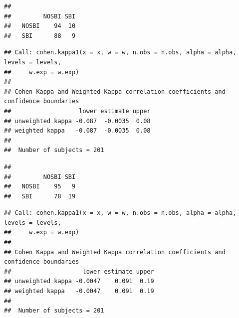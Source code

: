 \documentclass[
]{book}
\newenvironment{Shaded}{\begin{snugshade}}{\end{snugshade}}
\newcommand{\AttributeTok}[1]{\textcolor[rgb]{0.13,0.29,0.53}{#1}}
\newcommand{\CommentTok}[1]{\textcolor[rgb]{0.56,0.35,0.01}{\textit{#1}}}
\newcommand{\FunctionTok}[1]{\textcolor[rgb]{0.13,0.29,0.53}{\textbf{#1}}}
\newcommand{\NormalTok}[1]{#1}
\newcommand{\SpecialCharTok}[1]{\textcolor[rgb]{0.81,0.36,0.00}{\textbf{#1}}}
\newcommand{\StringTok}[1]{\textcolor[rgb]{0.31,0.60,0.02}{#1}}
\begin{document}
\begin{verbatim}
##        
##         NOSBI SBI
##   NOSBI    94  10
##   SBI      88   9
\end{verbatim}

\begin{Shaded}
\end{Shaded}

\begin{verbatim}
## Call: cohen.kappa1(x = x, w = w, n.obs = n.obs, alpha = alpha, levels = levels, 
##     w.exp = w.exp)
## 
## Cohen Kappa and Weighted Kappa correlation coefficients and confidence boundaries 
##                   lower estimate upper
## unweighted kappa -0.087  -0.0035  0.08
## weighted kappa   -0.087  -0.0035  0.08
## 
##  Number of subjects = 201
\end{verbatim}

\begin{Shaded}
\end{Shaded}

\begin{verbatim}
##        
##         NOSBI SBI
##   NOSBI    95   9
##   SBI      78  19
\end{verbatim}

\begin{Shaded}
\end{Shaded}

\begin{verbatim}
## Call: cohen.kappa1(x = x, w = w, n.obs = n.obs, alpha = alpha, levels = levels, 
##     w.exp = w.exp)
## 
## Cohen Kappa and Weighted Kappa correlation coefficients and confidence boundaries 
##                    lower estimate upper
## unweighted kappa -0.0047    0.091  0.19
## weighted kappa   -0.0047    0.091  0.19
## 
##  Number of subjects = 201
\end{verbatim}
\end{document}
